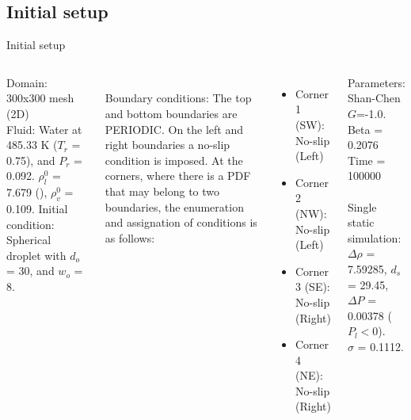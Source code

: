 \documentclass[8pt]{beamer}
\begin{document}
	\subsection{Initial setup}
	\begin{frame}[t]{Initial setup}
		\justifying
		\begin{columns}[t]
			
			Domain: 300x300 mesh (2D)\\
			Fluid: Water at 485.33 K ($T_r$ = 0.75), and $P_r$ = 0.092. $\rho_l^0$  = 7.679 (), $\rho_v^0$  = 0.109.
			Initial condition: Spherical droplet with $d_o$ = 30, and $w_o$ = 8.
			
			~\\
			Boundary conditions: The top and bottom boundaries are PERIODIC. On the left and right boundaries a no-slip condition is imposed. At the corners, where there is a PDF that may belong to two boundaries, the enumeration and assignation of conditions is as follows:
			\begin{itemize}
				\item Corner 1 (SW): No-slip (Left)
				\item Corner 2 (NW): No-slip (Left)
				\item Corner 3 (SE): No-slip (Right)
				\item Corner 4 (NE): No-slip (Right)
			\end{itemize}
		

			
			
			
			Parameters: Shan-Chen $G$=-1.0. \\
			Beta = 0.2076\\
			Time = 100000\\
			
			~\\
			Single static simulation:\\ $\Delta \rho $ = 7.59285, $d_s$ = 29.45, \\ $\Delta P$ = 0.00378 ($P_l < 0$). \\$\sigma$ = 0.1112.
		\end{columns}
	\end{frame}

\end{document}
